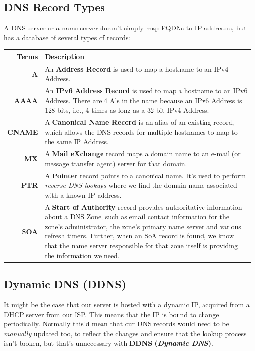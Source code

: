 \subsection{DNS Record Types}
A DNS server or a name server doesn't simply map FQDNs to IP addresses, but has a database of several types of records:

\noindent
\begin{tabular}{rM{0.85}}
	\toprule
	\textbf{Terms} &\textbf{Description} \\
	\midrule
	\textbf{A}	&An \textbf{Address Record} is used to map a hostname to an IPv4 Address.\\
	\midrule
	\textbf{AAAA}	&An \textbf{IPv6 Address Record} is used to map a hostname to an IPv6 Address. There are 4 A's in the name because an IPv6 Address is 128-bits, i.e., 4 times as long as a 32-bit IPv4 Address.\\
	\midrule
	\textbf{CNAME}	&A \textbf{Canonical Name Record} is an alias of an existing record, which allows the DNS records for multiple hostnames to map to the same IP Address.\\
	\midrule
	\textbf{MX}	&A \textbf{Mail eXchange} record maps a domain name to an e-mail (or message transfer agent) server for that domain.\\
	\midrule
	\textbf{PTR}	&A \textbf{Pointer} record points to a canonical name. It's used to perform \textit{reverse DNS lookups} where we find the domain name associated with a known IP address.\\
	\midrule
	\textbf{SOA}	&A \textbf{Start of Authority} record provides authoritative information about a DNS Zone, such as email contact information for the zone's administrator, the zone's primary name server and various refresh timers. Further, when an SoA record is found, we know that the name server responsible for that zone itself is providing the information we need.\\
	\bottomrule
\end{tabular}

\subsection{Dynamic DNS (DDNS)}
It might be the case that our server is hosted with a dynamic IP, acquired from a DHCP server from our ISP. This means that the IP is bound to change periodically. Normally this'd mean that our DNS records would need to be \textit{manually} updated too, to reflect the changes and ensure that the lookup process isn't broken, but that's unnecessary with \textbf{DDNS (\textit{Dynamic DNS})}.

